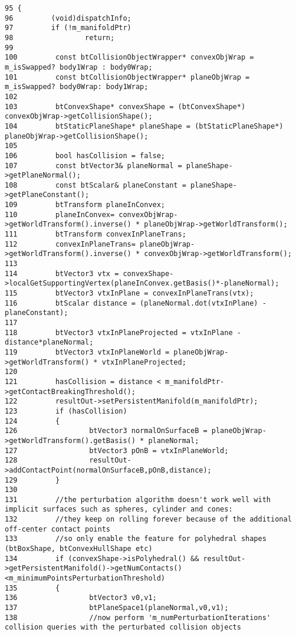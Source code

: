 \begin{Code}\begin{verbatim}95 {
96         (void)dispatchInfo;
97         if (!m_manifoldPtr)
98                 return;
99 
100         const btCollisionObjectWrapper* convexObjWrap = m_isSwapped? body1Wrap : body0Wrap;
101         const btCollisionObjectWrapper* planeObjWrap = m_isSwapped? body0Wrap: body1Wrap;
102 
103         btConvexShape* convexShape = (btConvexShape*) convexObjWrap->getCollisionShape();
104         btStaticPlaneShape* planeShape = (btStaticPlaneShape*) planeObjWrap->getCollisionShape();
105 
106         bool hasCollision = false;
107         const btVector3& planeNormal = planeShape->getPlaneNormal();
108         const btScalar& planeConstant = planeShape->getPlaneConstant();
109         btTransform planeInConvex;
110         planeInConvex= convexObjWrap->getWorldTransform().inverse() * planeObjWrap->getWorldTransform();
111         btTransform convexInPlaneTrans;
112         convexInPlaneTrans= planeObjWrap->getWorldTransform().inverse() * convexObjWrap->getWorldTransform();
113 
114         btVector3 vtx = convexShape->localGetSupportingVertex(planeInConvex.getBasis()*-planeNormal);
115         btVector3 vtxInPlane = convexInPlaneTrans(vtx);
116         btScalar distance = (planeNormal.dot(vtxInPlane) - planeConstant);
117 
118         btVector3 vtxInPlaneProjected = vtxInPlane - distance*planeNormal;
119         btVector3 vtxInPlaneWorld = planeObjWrap->getWorldTransform() * vtxInPlaneProjected;
120 
121         hasCollision = distance < m_manifoldPtr->getContactBreakingThreshold();
122         resultOut->setPersistentManifold(m_manifoldPtr);
123         if (hasCollision)
124         {
126                 btVector3 normalOnSurfaceB = planeObjWrap->getWorldTransform().getBasis() * planeNormal;
127                 btVector3 pOnB = vtxInPlaneWorld;
128                 resultOut->addContactPoint(normalOnSurfaceB,pOnB,distance);
129         }
130 
131         //the perturbation algorithm doesn't work well with implicit surfaces such as spheres, cylinder and cones:
132         //they keep on rolling forever because of the additional off-center contact points
133         //so only enable the feature for polyhedral shapes (btBoxShape, btConvexHullShape etc)
134         if (convexShape->isPolyhedral() && resultOut->getPersistentManifold()->getNumContacts()<m_minimumPointsPerturbationThreshold)
135         {
136                 btVector3 v0,v1;
137                 btPlaneSpace1(planeNormal,v0,v1);
138                 //now perform 'm_numPerturbationIterations' collision queries with the perturbated collision objects

\end{verbatim}
\end{Code}

